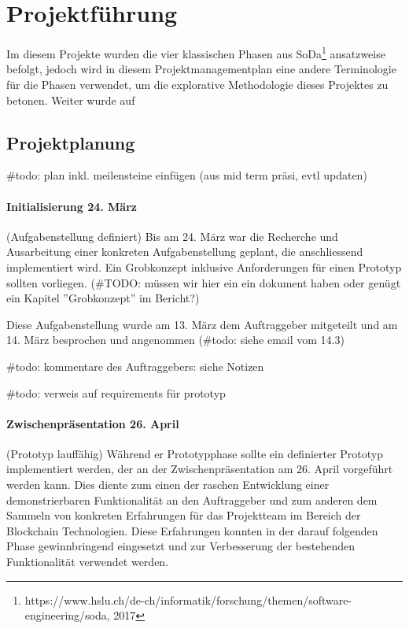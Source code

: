\section{Projektführung}
Im diesem Projekte wurden die vier klassischen Phasen aus SoDa\footnote{https://www.hslu.ch/de-ch/informatik/forschung/themen/software-engineering/soda, 2017} ansatzweise befolgt, jedoch wird in diesem Projektmanagementplan eine andere Terminologie für die Phasen verwendet, um die explorative Methodologie dieses Projektes zu betonen. Weiter wurde auf 

\subsection{Projektplanung}
\#todo: plan inkl. meilensteine einfügen (aus mid term präsi, evtl updaten)

\paragraph{Initialisierung 24. März}
(Aufgabenstellung definiert) Bis am 24. März war die Recherche und Ausarbeitung einer konkreten Aufgabenstellung geplant, die anschliessend implementiert wird. Ein Grobkonzept inklusive Anforderungen für einen Prototyp sollten vorliegen. (\#TODO: müssen wir hier ein ein dokument haben oder genügt ein Kapitel ''Grobkonzept'' im Bericht?)

Diese Aufgabenstellung wurde am 13. März dem Auftraggeber mitgeteilt und am 14. März besprochen und angenommen (\#todo: siehe email vom 14.3)

\#todo: kommentare des Auftraggebers: siehe Notizen

\#todo: verweis auf requirements für prototyp

\paragraph{Zwischenpräsentation 26. April}
(Prototyp lauffähig) Während er Prototypphase sollte ein definierter Prototyp implementiert werden, der an der Zwischenpräsentation am 26. April vorgeführt werden kann. Dies diente zum einen der raschen Entwicklung einer demonstrierbaren Funktionalität an den Auftraggeber und zum anderen dem Sammeln von konkreten Erfahrungen für das Projektteam im Bereich der Blockchain Technologien. Diese Erfahrungen konnten in der darauf folgenden Phase gewinnbringend eingesetzt und zur Verbesserung der bestehenden Funktionalität verwendet werden.

